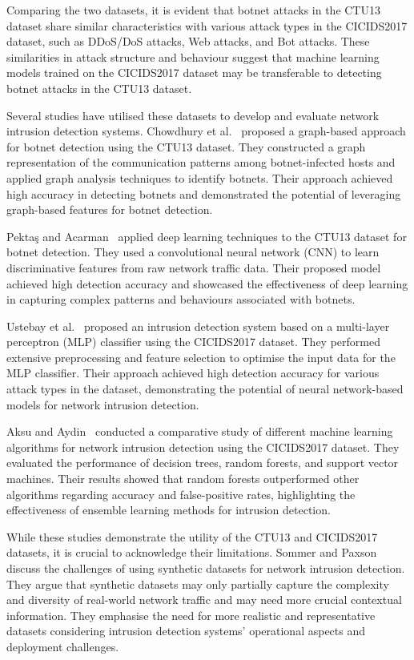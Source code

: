 Comparing the two datasets, it is evident that botnet attacks in the CTU13 dataset share similar characteristics with various attack types in the CICIDS2017 dataset, such as DDoS/DoS attacks, Web attacks, and Bot attacks. These similarities in attack structure and behaviour suggest that machine learning models trained on the CICIDS2017 dataset may be transferable to detecting botnet attacks in the CTU13 dataset.

Several studies have utilised these datasets to develop and evaluate network intrusion detection systems. Chowdhury et al.~\cite{chowdhury2017botnet} proposed a graph-based approach for botnet detection using the CTU13 dataset. They constructed a graph representation of the communication patterns among botnet-infected hosts and applied graph analysis techniques to identify botnets. Their approach achieved high accuracy in detecting botnets and demonstrated the potential of leveraging graph-based features for botnet detection.

Pektaş and Acarman~\cite{pektacs2019deep} applied deep learning techniques to the CTU13 dataset for botnet detection. They used a convolutional neural network (CNN) to learn discriminative features from raw network traffic data. Their proposed model achieved high detection accuracy and showcased the effectiveness of deep learning in capturing complex patterns and behaviours associated with botnets.

Ustebay et al.~\cite{ustebay2018intrusion} proposed an intrusion detection system based on a multi-layer perceptron (MLP) classifier using the CICIDS2017 dataset. They performed extensive preprocessing and feature selection to optimise the input data for the MLP classifier. Their approach achieved high detection accuracy for various attack types in the dataset, demonstrating the potential of neural network-based models for network intrusion detection.

Aksu and Aydin~\cite{aksu2018detecting} conducted a comparative study of different machine learning algorithms for network intrusion detection using the CICIDS2017 dataset. They evaluated the performance of decision trees, random forests, and support vector machines. Their results showed that random forests outperformed other algorithms regarding accuracy and false-positive rates, highlighting the effectiveness of ensemble learning methods for intrusion detection.

While these studies demonstrate the utility of the CTU13 and CICIDS2017 datasets, it is crucial to acknowledge their limitations. Sommer and Paxson~\cite{sommer2010outside} discuss the challenges of using synthetic datasets for network intrusion detection. They argue that synthetic datasets may only partially capture the complexity and diversity of real-world network traffic and may need more crucial contextual information. They emphasise the need for more realistic and representative datasets considering intrusion detection systems' operational aspects and deployment challenges.

